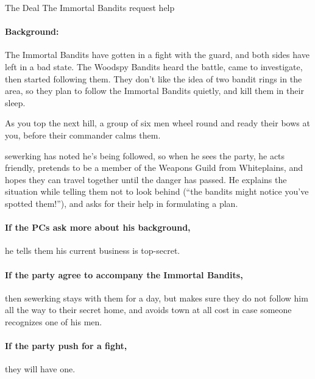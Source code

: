 \begin{multicols}{2}
{The Deal}%
{The Immortal Bandits request help}%

\paragraph{Background:}
The Immortal Bandits have gotten in a fight with the \gls{guard}, and both sides have left in a bad state.
The Woodspy Bandits heard the battle, came to investigate, then started following them.
They don't like the idea of two bandit rings in the area, so they plan to follow the Immortal Bandits quietly, and kill them in their sleep.

\begin{boxtext}

  As you top the next hill, a group of six men wheel round and ready their bows at you, before their commander calms them.

\end{boxtext}

\Gls{sewerking} has noted he's being followed, so when he sees the party, he acts friendly, pretends to be a member of the Weapons Guild from Whiteplains, and hopes they can travel together until the danger has passed.
He explains the situation while telling them not to look behind (``the bandits might notice you've spotted them!''), and asks for their help in formulating a plan.

\paragraph{If the PCs ask more about his background,}
he tells them his current business is top-secret.


\sewerking


\paragraph{If the party agree to accompany the Immortal Bandits,}
then \gls{sewerking} stays with them for a day, but makes sure they do not follow him all the way to their secret home, and avoids town at all cost in case someone recognizes one of his men.

\paragraph{If the party push for a fight,}
they will have one.


\end{multicols}
